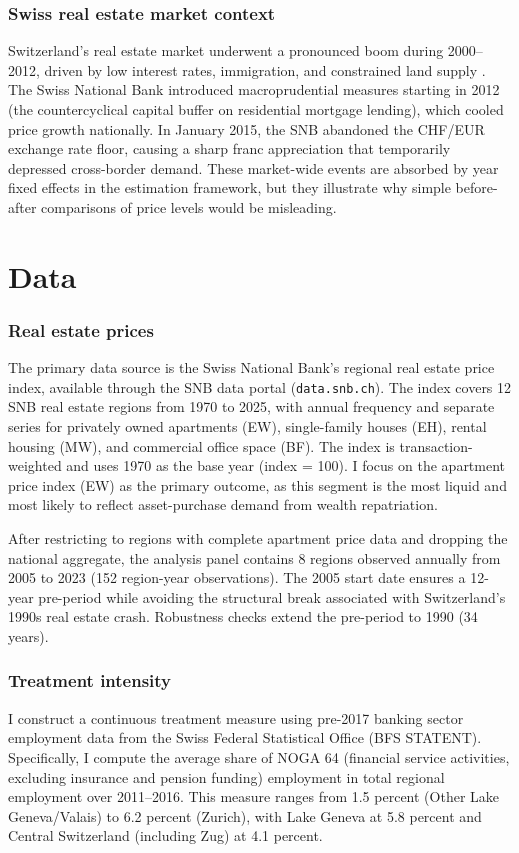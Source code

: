 \documentclass[12pt]{article}
\begin{document}
\subsubsection*{Swiss real estate market context} Switzerland's real estate market underwent a pronounced boom during 2000--2012, driven by low interest rates, immigration, and constrained land supply \citep{waltert2018swiss}. The Swiss National Bank introduced macroprudential measures starting in 2012 (the countercyclical capital buffer on residential mortgage lending), which cooled price growth nationally. In January 2015, the SNB abandoned the CHF/EUR exchange rate floor, causing a sharp franc appreciation that temporarily depressed cross-border demand. These market-wide events are absorbed by year fixed effects in the estimation framework, but they illustrate why simple before-after comparisons of price levels would be misleading.


\section{Data}
\label{sec:data}

\subsubsection*{Real estate prices} The primary data source is the Swiss National Bank's regional real estate price index, available through the SNB data portal (\texttt{data.snb.ch}). The index covers 12 SNB real estate regions from 1970 to 2025, with annual frequency and separate series for privately owned apartments (EW), single-family houses (EH), rental housing (MW), and commercial office space (BF). The index is transaction-weighted and uses 1970 as the base year (index = 100). I focus on the apartment price index (EW) as the primary outcome, as this segment is the most liquid and most likely to reflect asset-purchase demand from wealth repatriation.

After restricting to regions with complete apartment price data and dropping the national aggregate, the analysis panel contains 8 regions observed annually from 2005 to 2023 (152 region-year observations). The 2005 start date ensures a 12-year pre-period while avoiding the structural break associated with Switzerland's 1990s real estate crash. Robustness checks extend the pre-period to 1990 (34 years).

\subsubsection*{Treatment intensity} I construct a continuous treatment measure using pre-2017 banking sector employment data from the Swiss Federal Statistical Office (BFS STATENT). Specifically, I compute the average share of NOGA 64 (financial service activities, excluding insurance and pension funding) employment in total regional employment over 2011--2016. This measure ranges from 1.5 percent (Other Lake Geneva/Valais) to 6.2 percent (Zurich), with Lake Geneva at 5.8 percent and Central Switzerland (including Zug) at 4.1 percent.
\end{document}
